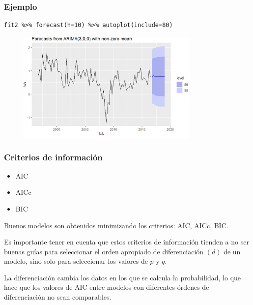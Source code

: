 \documentclass[10pt]{beamer}
\begin{document}
\begin{frame}[fragile]
\frametitle{Ejemplo}


\lstset{language=r,label= ,caption= ,captionpos=b,numbers=none}
\begin{lstlisting}
fit2 %>% forecast(h=10) %>% autoplot(include=80)
\end{lstlisting}

\pause


\begin{figure}
\begin{center}
    \includegraphics[width=0.8\textwidth]{Imagen15.JPG}
\end{center}
\end{figure}


\end{frame}






\begin{frame}[fragile]
\frametitle{Criterios de información}


\begin{itemize}
\item AIC
\item AICc
\item BIC
\end{itemize}

\vspace{4mm}

Buenos modelos son obtenidos minimizando los criterios: AIC, AICc, BIC.

\vspace{4mm}

Es importante tener en cuenta que estos criterios de información tienden a no ser buenas guías para seleccionar el orden apropiado de diferenciación $(d)$ de un modelo, sino solo para seleccionar los valores de $p$ y $q$.

\vspace{4mm}

La diferenciación cambia los datos en los que se calcula la probabilidad, lo que hace que los valores de AIC entre modelos con diferentes órdenes de diferenciación no sean comparables.

\end{frame}
\end{document}
